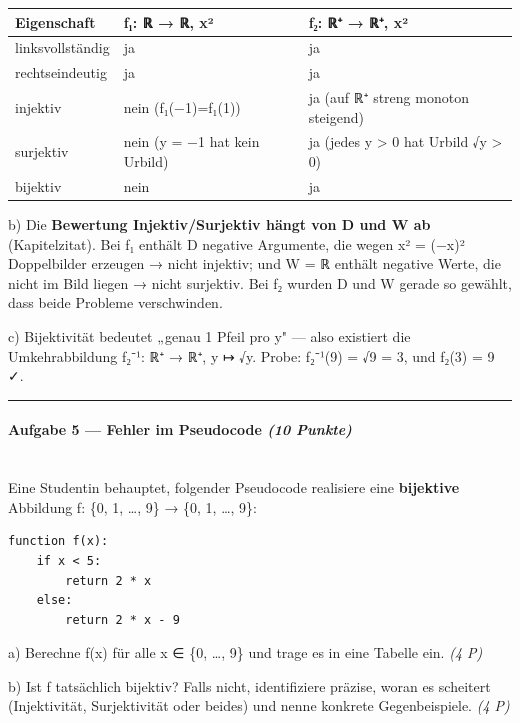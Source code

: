 \documentclass[11pt, a4paper]{article}
\begin{document}
{\small
\begin{tabularx}{\linewidth}{XXX}
\hline
\rowcolor{tableheadbg}
{\color{white}\textbf{Eigenschaft}} & {\color{white}\textbf{f₁: ℝ → ℝ, x²}} & {\color{white}\textbf{f₂: ℝ⁺ → ℝ⁺, x²}} \\[2pt]
\hline
\endhead
\hline
\endfoot
linksvollständig & ja & ja \\
rechtseindeutig & ja & ja \\
injektiv & nein (f₁(−1)=f₁(1)) & ja (auf ℝ⁺ streng monoton steigend) \\
surjektiv & nein (y = −1 hat kein Urbild) & ja (jedes y > 0 hat Urbild √y > 0) \\
bijektiv & nein & ja \\
\end{tabularx}
}


b) Die \textbf{Bewertung Injektiv/Surjektiv hängt von D und W ab} (Kapitelzitat). Bei f₁ enthält D negative Argumente, die wegen x² = (−x)² Doppelbilder erzeugen → nicht injektiv; und W = ℝ enthält negative Werte, die nicht im Bild liegen → nicht surjektiv. Bei f₂ wurden D und W gerade so gewählt, dass beide Probleme verschwinden.


c) Bijektivität bedeutet „genau 1 Pfeil pro y" — also existiert die Umkehrabbildung f₂⁻¹: ℝ⁺ → ℝ⁺, y ↦ √y. Probe: f₂⁻¹(9) = √9 = 3, und f₂(3) = 9 ✓.



\noindent\textcolor{rulegray}{\rule{\linewidth}{0.4pt}}


\paragraph{Aufgabe 5 — Fehler im Pseudocode \textit{(10 Punkte)}}\mbox{}\\[2pt]

Eine Studentin behauptet, folgender Pseudocode realisiere eine \textbf{bijektive} Abbildung f: \{0, 1, …, 9\} → \{0, 1, …, 9\}:


\begin{lstlisting}
function f(x):
    if x < 5:
        return 2 * x
    else:
        return 2 * x - 9
\end{lstlisting}


a) Berechne f(x) für alle x ∈ \{0, …, 9\} und trage es in eine Tabelle ein. \textit{(4 P)}


b) Ist f tatsächlich bijektiv? Falls nicht, identifiziere präzise, woran es scheitert (Injektivität, Surjektivität oder beides) und nenne konkrete Gegenbeispiele. \textit{(4 P)}
\end{document}
